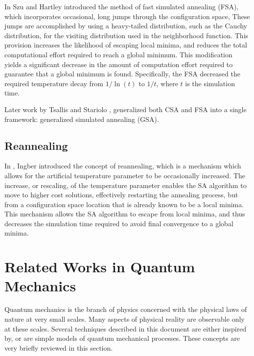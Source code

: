 \documentclass[11pt]{afthesis}
\begin{document}
	In \cite{szu1987fastsimulatedannealing} Szu and Hartley introduced the method of fast simulated annealing (FSA), which incorporates occasional, long jumps through the configuration space, These jumps are accomplished by using a heavy-tailed distribution, such as the Cauchy distribution, for the visiting distribution used in the neighborhood function. This provision increases the likelihood of escaping local minima, and reduces the total computational effort required to reach a global minimum. This modification yields a significant decrease in the amount of computation effort required to guarantee that a global minimum is found. Specifically, the FSA decreased the required temperature decay from $1/\ln(t)$ to $1/t$, where $t$ is the simulation time. 
	
	Later work by Tsallis and Stariolo \cite{tsallis1996generalizedsimulatedannealing}, generalized both CSA and FSA into a single framework: generalized simulated annealing (GSA). 
	
	\subsection{Reannealing}
	
	In \cite{ingber1989veryfastsimulatedreannealing}, Ingber introduced the concept of reannealing, which is a mechanism which allows for the artificial temperature parameter to be occasionally increased. The increase, or rescaling, of the temperature parameter enables the SA algorithm to move to higher cost solutions, effectively restarting the annealing process, but from a configuration space location that is already known to be a local minima. This mechanism allows the SA algorithm to escape from local minima, and thus decreases the simulation time required to avoid final convergence to a global minima.
	
	\section{Related Works in Quantum Mechanics}
	
	Quantum mechanics is the branch of physics concerned with the physical laws of nature at very small scales. Many aspects of physical reality are observable only at these scales. Several techniques described in this document are either inspired by, or are simple models of quantum mechanical processes. These concepts are very briefly reviewed in this section. 
	
\end{document}
